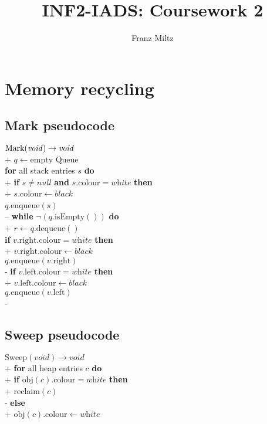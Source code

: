 \documentclass{article}
\title{INF2-IADS: Coursework 2}
\author{Franz Miltz}
\begin{document}
\maketitle

\tableofcontents

\section{Memory recycling}

\subsection{Mark pseudocode}

\begin{pseudo}
$\text{Mark}(\text{\emph{void}}) \to \text{\emph{void}}$\\+
    $q\leftarrow \text{empty Queue}$\\
    \textbf{for} all stack entries $s$ \textbf{do}\\+
        \textbf{if} $s\not=\textit{null}$ \textbf{and} $s.\text{colour} = \textit{white}$ \textbf{then}\\+
            $s.\text{colour} \leftarrow \textit{black}$\\
            $q$.enqueue$(s)$\\--
    \textbf{while} $\neg(q.\text{isEmpty}())$ \textbf{do}\\+
        $r\leftarrow q.\text{dequeue}()$\\
        \textbf{if} $v.\text{right}.\text{colour} = \textit{white}$ \textbf{then}\\+
            $v.\text{right}.\text{colour}\leftarrow\textit{black}$\\
            $q.\text{enqueue}(v.\text{right})$\\-
        \textbf{if} $v.\text{left}.\text{colour} = \textit{white}$ \textbf{then}\\+
            $v.\text{left}.\text{colour}\leftarrow\textit{black}$\\
            $q.\text{enqueue}(v.\text{left})$\\-
\end{pseudo}

\subsection{Sweep pseudocode}

\begin{pseudo}
$\text{Sweep}(\textit{void})\to\textit{void}$\\+
    \textbf{for} all heap entries $c$ \textbf{do}\\+
        \textbf{if} $\text{obj}(c).\text{colour} = \textit{white}$ \textbf{then}\\+
            reclaim$(c)$\\-
        \textbf{else}\\+
            $\text{obj}(c).\text{colour}\leftarrow\textit{white}$
\end{pseudo}
\end{document}
